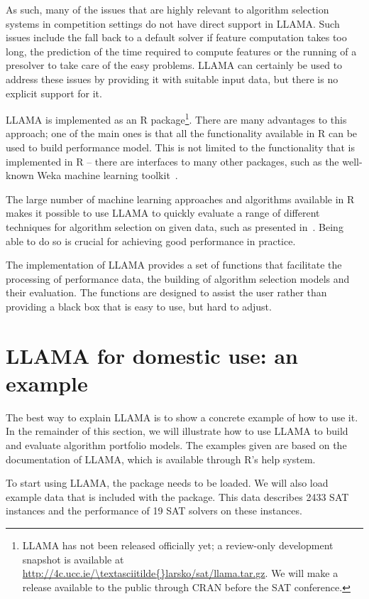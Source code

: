 \documentclass{llncs}
\begin{document}
As such, many of the issues that are highly relevant to algorithm selection
systems in competition settings do not have direct support in LLAMA. Such issues
include the fall back to a default solver if feature computation takes too long,
the prediction of the time required to compute features or the running of a
presolver to take care of the easy problems. LLAMA can certainly be used to
address these issues by providing it with suitable input data, but there is no
explicit support for it.

LLAMA is implemented as an R package\footnote{LLAMA has not been released
officially yet; a review-only development snapshot is available at
\url{http://4c.ucc.ie/\textasciitilde{}larsko/sat/llama.tar.gz}. We will make a
release available to the public through CRAN before the SAT conference.}. There
are many advantages to this approach; one of the main ones is that all the
functionality available in R can be used to build performance model. This is not
limited to the functionality that is implemented in R -- there are interfaces to
many other packages, such as the well-known Weka machine learning
toolkit~\cite{hall_weka_2009}.

The large number of machine learning approaches and algorithms available in R
makes it possible to use LLAMA to quickly evaluate a range of different
techniques for algorithm selection on given data, such as presented
in~\cite{kotthoff_evaluation_2012}. Being able to do so is crucial for achieving
good performance in practice.

The implementation of LLAMA provides a set of functions that facilitate the
processing of performance data, the building of algorithm selection models and
their evaluation. The functions are designed to assist the user rather than
providing a black box that is easy to use, but hard to adjust.


\section{LLAMA for domestic use: an example}

The best way to explain LLAMA is to show a concrete example of how to
use it. In the remainder of this section, we will illustrate how to use LLAMA to
build and evaluate algorithm portfolio models. The examples given are based on
the documentation of LLAMA, which is available through R's help system.

To start using LLAMA, the package needs to be loaded. We will also load example
data that is included with the package. This data describes 2433 SAT instances
and the performance of 19 SAT solvers on these instances.
\end{document}
